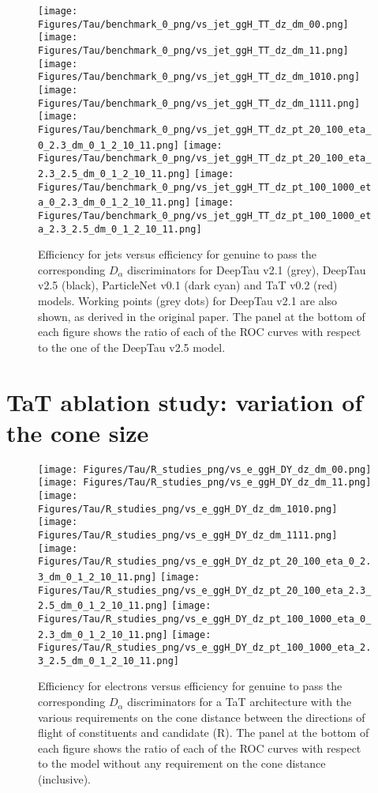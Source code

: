 \begin{figure}[H]
    \centering
    \texttt{[image: Figures/Tau/benchmark\_0\_png/vs\_jet\_ggH\_TT\_dz\_dm\_00.png]}
    \texttt{[image: Figures/Tau/benchmark\_0\_png/vs\_jet\_ggH\_TT\_dz\_dm\_11.png]}
    \texttt{[image: Figures/Tau/benchmark\_0\_png/vs\_jet\_ggH\_TT\_dz\_dm\_1010.png]}
    \texttt{[image: Figures/Tau/benchmark\_0\_png/vs\_jet\_ggH\_TT\_dz\_dm\_1111.png]}
    \texttt{[image: Figures/Tau/benchmark\_0\_png/vs\_jet\_ggH\_TT\_dz\_pt\_20\_100\_eta\_0\_2.3\_dm\_0\_1\_2\_10\_11.png]}
    \texttt{[image: Figures/Tau/benchmark\_0\_png/vs\_jet\_ggH\_TT\_dz\_pt\_20\_100\_eta\_2.3\_2.5\_dm\_0\_1\_2\_10\_11.png]}
    \texttt{[image: Figures/Tau/benchmark\_0\_png/vs\_jet\_ggH\_TT\_dz\_pt\_100\_1000\_eta\_0\_2.3\_dm\_0\_1\_2\_10\_11.png]}
    \texttt{[image: Figures/Tau/benchmark\_0\_png/vs\_jet\_ggH\_TT\_dz\_pt\_100\_1000\_eta\_2.3\_2.5\_dm\_0\_1\_2\_10\_11.png]}
    \caption{Efficiency for jets versus efficiency for genuine \tauh to pass the corresponding $D_\alpha$ discriminators for DeepTau v2.1 (grey), DeepTau v2.5 (black), ParticleNet v0.1 (dark cyan) and TaT v0.2 (red) models. Working points (grey dots) for DeepTau v2.1 are also shown, as derived in the original paper. The panel at the bottom of each figure shows the ratio of each of the ROC curves with respect to the one of the DeepTau v2.5 model.}
\end{figure}

\newpage
\section{TaT ablation study: variation of the cone size}\label{app:tat-cone}

\begin{figure}[H]
    \centering
    \texttt{[image: Figures/Tau/R\_studies\_png/vs\_e\_ggH\_DY\_dz\_dm\_00.png]}
    \texttt{[image: Figures/Tau/R\_studies\_png/vs\_e\_ggH\_DY\_dz\_dm\_11.png]}
    \texttt{[image: Figures/Tau/R\_studies\_png/vs\_e\_ggH\_DY\_dz\_dm\_1010.png]}
    \texttt{[image: Figures/Tau/R\_studies\_png/vs\_e\_ggH\_DY\_dz\_dm\_1111.png]}
    \texttt{[image: Figures/Tau/R\_studies\_png/vs\_e\_ggH\_DY\_dz\_pt\_20\_100\_eta\_0\_2.3\_dm\_0\_1\_2\_10\_11.png]}
    \texttt{[image: Figures/Tau/R\_studies\_png/vs\_e\_ggH\_DY\_dz\_pt\_20\_100\_eta\_2.3\_2.5\_dm\_0\_1\_2\_10\_11.png]}
    \texttt{[image: Figures/Tau/R\_studies\_png/vs\_e\_ggH\_DY\_dz\_pt\_100\_1000\_eta\_0\_2.3\_dm\_0\_1\_2\_10\_11.png]}
    \texttt{[image: Figures/Tau/R\_studies\_png/vs\_e\_ggH\_DY\_dz\_pt\_100\_1000\_eta\_2.3\_2.5\_dm\_0\_1\_2\_10\_11.png]}
    \caption{Efficiency for electrons versus efficiency for genuine \tauh to pass the corresponding $D_\alpha$ discriminators for a TaT architecture with the various requirements on the cone distance between the directions of flight of constituents and \tauh candidate (R). The panel at the bottom of each figure shows the ratio of each of the ROC curves with respect to the model without any requirement on the cone distance (inclusive).}
\end{figure}


